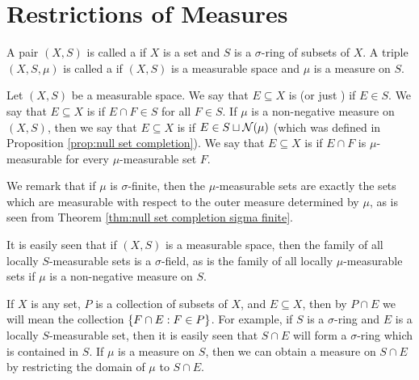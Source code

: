 
\section{Restrictions of Measures}

\begin{definition}
A pair $(X,S)$ is called a  if $X$ is a set and $S$ is a $\sigma$-ring of subsets of $X$. A triple $(X,S,\mu)$ is called a  if $(X,S)$ is a measurable space and $\mu$ is a measure on $S$.
\end{definition}

\begin{definition}\label{def:measure space set locally}
Let $(X, S)$ be a measurable space. We say that $E\subseteq X$ is  (or just ) if $E\in S$. We say that $E\subseteq X$ is  if $E\cap F\in S$ for all $F\in S$. If $\mu$ is a non-negative measure on $(X, S)$, then we say that $E\subseteq X$ is  if $E\in S\sqcup{\cal N}(\mu)$ (which was defined in Proposition \ref{prop:null set completion}). We say that $E\subseteq X$ is  if $E\cap F$ is $\mu$-measurable for every $\mu$-measurable set $F$.
\end{definition}

We remark that if $\mu$ is $\sigma$-finite, then the $\mu$-measurable sets are exactly the sets which are measurable with respect to the outer measure determined by $\mu$, as is seen from Theorem \ref{thm:null set completion sigma finite}.

It is easily seen that if $(X, S)$ is a measurable space, then the family of all locally $S$-measurable sets is a $\sigma$-field, as is the family of all locally $\mu$-measurable sets if $\mu$ is a non-negative measure on $S$.

If $X$ is any set, $P$ is a collection of subsets of $X$, and $E\subseteq X$, then by $P\cap E$ we will mean the collection $\left\{F\cap E:F\in P\right\}$. For example, if $S$ is a $\sigma$-ring and $E$ is a locally $S$-measurable set, then it is easily seen that $S\cap E$ will form a $\sigma$-ring which is contained in $S$. If $\mu$ is a measure on $S$, then we can obtain a measure on $S\cap E$ by restricting the domain of $\mu$ to $S\cap E$.

